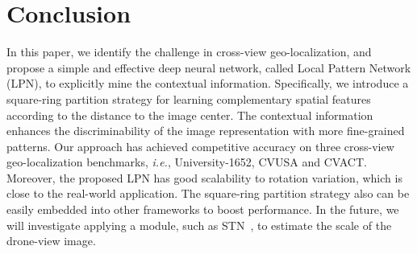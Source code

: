 \documentclass[journal]{IEEEtran}
\def\ie{\emph{i.e.}}
\begin{document}
\section{Conclusion}\label{conclusion}
In this paper, we identify the challenge in cross-view geo-localization, and propose a simple and effective deep neural network, called Local Pattern Network (LPN), to explicitly mine the contextual information. Specifically, we introduce a square-ring partition strategy for learning complementary spatial features according to the distance to the image center. The contextual information enhances the discriminability of the image representation with more fine-grained patterns. Our approach has achieved competitive accuracy on three cross-view geo-localization benchmarks, \ie, University-1652, CVUSA and CVACT. Moreover, the proposed LPN has good scalability to rotation variation, which is close to the real-world application. The square-ring partition strategy also can be easily embedded into other frameworks to boost performance. In the future, we will investigate applying a module, such as STN~\cite{jaderberg_spatial_2015}, to estimate the scale of the drone-view image.


\ifCLASSOPTIONcaptionsoff
  \newpage
\fi






\end{document}
